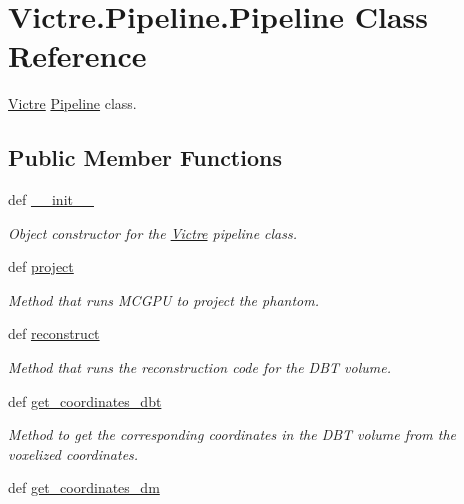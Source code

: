 \hypertarget{classVictre_1_1Pipeline_1_1Pipeline}{\section{Victre.\-Pipeline.\-Pipeline Class Reference}
\label{classVictre_1_1Pipeline_1_1Pipeline}
}


\hyperlink{namespaceVictre}{Victre} \hyperlink{classVictre_1_1Pipeline_1_1Pipeline}{Pipeline} class.  


\subsection*{Public Member Functions}
\begin{DoxyCompactItemize}
\item 
def \hyperlink{classVictre_1_1Pipeline_1_1Pipeline_a45627045131474e1dc8c218655aee2b2}{\-\_\-\-\_\-init\-\_\-\-\_\-}
\begin{DoxyCompactList}\small\item\em Object constructor for the \hyperlink{namespaceVictre}{Victre} pipeline class. \end{DoxyCompactList}\item 
def \hyperlink{classVictre_1_1Pipeline_1_1Pipeline_a372ba5d565da4224e4768316ac640f99}{project}
\begin{DoxyCompactList}\small\item\em Method that runs M\-C\-G\-P\-U to project the phantom. \end{DoxyCompactList}\item 
def \hyperlink{classVictre_1_1Pipeline_1_1Pipeline_ab7dbcc6b27ab4e563391e2d76045f609}{reconstruct}
\begin{DoxyCompactList}\small\item\em Method that runs the reconstruction code for the D\-B\-T volume. \end{DoxyCompactList}\item 
def \hyperlink{classVictre_1_1Pipeline_1_1Pipeline_a27d92d6338fea609839441a7f644ae41}{get\-\_\-coordinates\-\_\-dbt}
\begin{DoxyCompactList}\small\item\em Method to get the corresponding coordinates in the D\-B\-T volume from the voxelized coordinates. \end{DoxyCompactList}\item 
def \hyperlink{classVictre_1_1Pipeline_1_1Pipeline_a404619920d58648ef74e6307d8b6a7dc}{get\-\_\-coordinates\-\_\-dm}

\end{DoxyCompactItemize}
